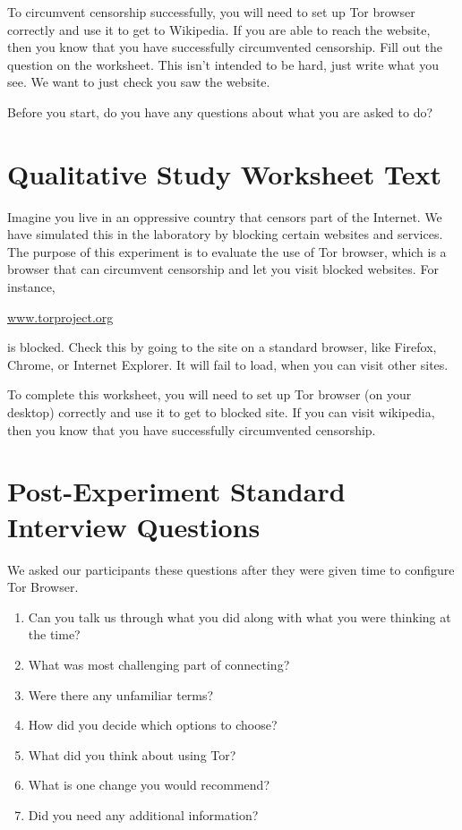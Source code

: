 \documentclass[USenglish,oneside,twocolumn]{article}
\begin{document}
To circumvent censorship successfully, you will need to set up Tor browser correctly and use it to get to Wikipedia. If you are able to reach the website, then you know that you have successfully circumvented censorship. Fill out the question on the worksheet. This isn't intended to be hard, just write what you see. We want to just check you saw the website. 

Before you start, do you have any questions about what you are asked to do? 

\section{Qualitative Study Worksheet Text} 
\label{participant-worksheet}
Imagine you live in an oppressive country that censors part of the Internet. We have simulated this in the laboratory by blocking certain websites and services. The purpose of this experiment is to evaluate the use of Tor browser, which is a browser that can circumvent censorship and let you visit blocked websites. For instance, \begin{NoHyper}\url{www.torproject.org}\end{NoHyper} is blocked. Check this by going to the site on a standard browser, like Firefox, Chrome, or Internet Explorer. It will fail to load, when you can visit other sites.

To complete this worksheet, you will need to set up Tor browser (on your desktop) correctly and use it to get to blocked site. If you can visit wikipedia, then you know that you have successfully circumvented censorship.

\section{Post-Experiment Standard Interview Questions}
\label{interview-questions}
We asked our participants these questions after they were given time to configure Tor Browser. \\

\begin{enumerate}
\item{Can you talk us through what you did along with what you were thinking at the time?}
\item{What was most challenging part of connecting?}
\item{Were there any unfamiliar terms?}
\item{How did you decide which options to choose?}
\item{What did you think about using Tor?}
\item{What is one change you would recommend?} 
\item{Did you need any additional information?} 
\end{enumerate}  
\end{document}
